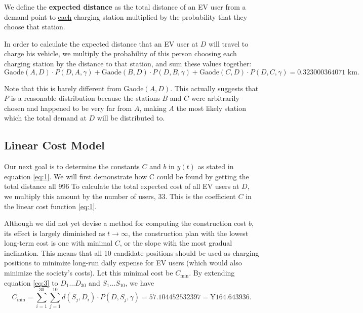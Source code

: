 \documentclass[10pt]{article}
\begin{document}
We define the \textbf{expected distance} as the total distance of an EV user from a demand point to \underline{each} charging station multiplied by the probability that they choose that station.

In order to calculate the expected distance that an EV user at $D$ will travel to charge his vehicle, we multiply the probability of this person choosing each charging station by the distance to that station, and sum these values together: 
\begin{equation}\label{eq:3}
\mathrm{Gaode}\left(A,D\right) \cdot P(D, A, \gamma) + \mathrm{Gaode}\left(B,D\right) \cdot P(D, B, \gamma) + \mathrm{Gaode}\left(C,D\right) \cdot P(D, C, \gamma) = 0.323000364071 \text{ km}.
\end{equation}

Note that this is barely different from $\mathrm{Gaode}\left(A,D\right).$ This actually suggests that $P$ is a reasonable distribution because the stations $B$ and $C$ were arbitrarily chosen and happened to be very far from $A$, making $A$ the most likely station which the total demand at $D$ will be distributed to.


\subsection{Linear Cost Model}
Our next goal is to determine the constants $C$ and $b$ in $y(t)$ as stated in equation \eqref{eq:1}. We will first demonstrate how C could be found by getting the total distance all 996  To calculate the total expected cost of all EV users at $D$, we multiply this amount by the number of users, 33. This is the coefficient $C$ in the linear cost function \eqref{eq:1}.

Although we did not yet devise a method for computing the construction cost $b$, its effect is largely diminished as $t \to \infty$, the construction plan with the lowest long-term cost is one with minimal $C$, or the slope with the most gradual inclination. This means that all 10 candidate positions should be used as charging positions to minimize long-run daily expense for EV users (which would also minimize the society's costs). Let this minimal cost be $C_\text{min}$. By extending equation \eqref{eq:3} to $D_1 \dots D_{30}$ and $S_1 \dots S_{10}$, we have
\begin{equation}\label{eq:4}
C_\text{min} = \sum_{i=1}^{30}\sum_{j=1}^{10}d\left(S_j, D_i\right) \cdot P(D, S_j, \gamma) = 57.104452532397 = \text{¥} 164.643936.
\end{equation}
\end{document}

